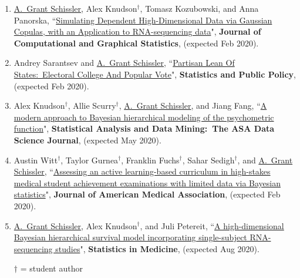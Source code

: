 \documentclass[paper=a4,fontsize=11pt]{scrartcl} %
\newcommand{\NewPart}[2]{\section*{\uppercase{#1} #2 }}
\newcommand{\PaperEntry}[7]{
		\noindent #1, ``\href{#7}{#2}", \textit{#3} \textbf{#4}, #5 (#6).}
\begin{document}
\begin{enumerate}

  
\item \PaperEntry{\underline{A.~Grant Schissler}, Alex Knudson$^{\dagger}$, Tomasz Kozubowski, and Anna Panorska}{Simulating Dependent High-Dimensional Data via Gaussian Copulas, with an Application to RNA-sequencing data}{}{Journal of Computational and Graphical Statistics}{}{expected Feb 2020}{}

\item \PaperEntry{Andrey Sarantsev and \underline{A.~Grant Schissler}}{Partisan Lean Of States:~Electoral College And Popular Vote}{}{Statistics and Public Policy}{}{expected Feb 2020}{}
  
\item \PaperEntry{Alex Knudson$^{\dagger}$, Allie Scurry$^{\dagger}$, \underline{A.~Grant Schissler}, and Jiang Fang}{A modern approach to Bayesian hierarchical modeling of the psychometric function}{}{Statistical Analysis and Data Mining:~The ASA Data Science Journal}{}{expected May 2020}{}

  \item \PaperEntry{Austin Witt$^{\dagger}$, Taylor Gurnea$^{\dagger}$, Franklin Fuchs$^{\dagger}$, Sahar Sedigh$^{\dagger}$, and \underline{A.~Grant Schissler}}{Assessing an active learning-based curriculum in high-stakes medical student achievement examinations with limited data via Bayesian statistics}{}{Journal of American Medical Association}{}{expected Feb 2020}{}

  \item \PaperEntry{\underline{A.~Grant Schissler}, Alex Knudson$^{\dagger}$, and Juli Petereit}{A high-dimensional Bayesian hierarchical survival model incorporating single-subject RNA-sequencing studies}{}{Statistics in Medicine}{}{expected Aug 2020}{}
  

  $\dagger$ = student author
  
\end{enumerate}


\end{document}
